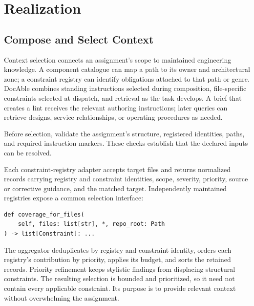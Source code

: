 \section{Realization}

\subsection*{Compose and Select Context}

Context selection connects an assignment's scope to maintained engineering knowledge. A component catalogue can map a path to its owner and architectural zone; a constraint registry can identify obligations attached to that path or genre. DocAble combines standing instructions selected during composition, file-specific constraints selected at dispatch, and retrieval as the task develops. A brief that creates a lint receives the relevant authoring instructions; later queries can retrieve designs, service relationships, or operating procedures as needed.

Before selection, validate the assignment's structure, registered identities, paths, and required instruction markers. These checks establish that the declared inputs can be resolved.

Each constraint-registry adapter accepts target files and returns normalized records carrying registry and constraint identities, scope, severity, priority, source or corrective guidance, and the matched target. Independently maintained registries expose a common selection interface:

\begin{verbatim}
def coverage_for_files(
    self, files: list[str], *, repo_root: Path
) -> list[Constraint]: ...
\end{verbatim}

The aggregator deduplicates by registry and constraint identity, orders each registry's contribution by priority, applies its budget, and sorts the retained records. Priority refinement keeps stylistic findings from displacing structural constraints. The resulting selection is bounded and prioritized, so it need not contain every applicable constraint. Its purpose is to provide relevant context without overwhelming the assignment.

